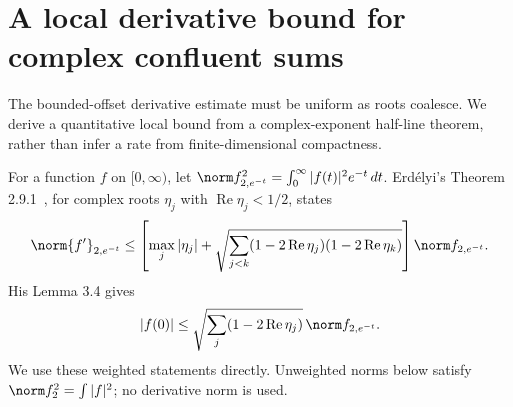 \documentclass[11pt,a4paper]{article}
\numberwithin{equation}{section}
\theoremstyle{definition}\newtheorem{definition}[theorem]{Definition}
\theoremstyle{remark}\newtheorem{remark}[theorem]{Remark}
\DeclareMathOperator{\Rea}{Re}\DeclareMathOperator{\Ima}{Im}
\begin{document}
\section{A local derivative bound for complex confluent sums}\label{sw:sec:derivative}
The bounded-offset derivative estimate must be uniform as roots coalesce. We derive a quantitative local bound from a complex-exponent half-line theorem, rather than infer a rate from finite-dimensional compactness.

For a function $f$ on $[0,\infty)$, let
$\norm f_{2,e^{-t}}^2=\int_0^\infty|f(t)|^2e^{-t}\,dt$.
Erd\'elyi's Theorem 2.9.1~\cite{Erdelyi}, for complex roots $\eta_j$ with $\Rea\eta_j<1/2$, states
\begin{equation}\label{sw:eq:source-derivative}
 \norm{f'}_{2,e^{-t}}\le
 \left[\max_j|\eta_j|+
 \sqrt{\sum_{j<k}(1-2\Rea\eta_j)(1-2\Rea\eta_k)}\right]
 \norm f_{2,e^{-t}}.
\end{equation}
His Lemma 3.4 gives
\begin{equation}\label{sw:eq:source-eval}
 |f(0)|\le\sqrt{\sum_j(1-2\Rea\eta_j)}\,
                         \norm f_{2,e^{-t}}.
\end{equation}
We use these weighted statements directly. Unweighted norms below satisfy $\norm f_2^2=\int|f|^2$; no derivative norm is used.
\end{document}
